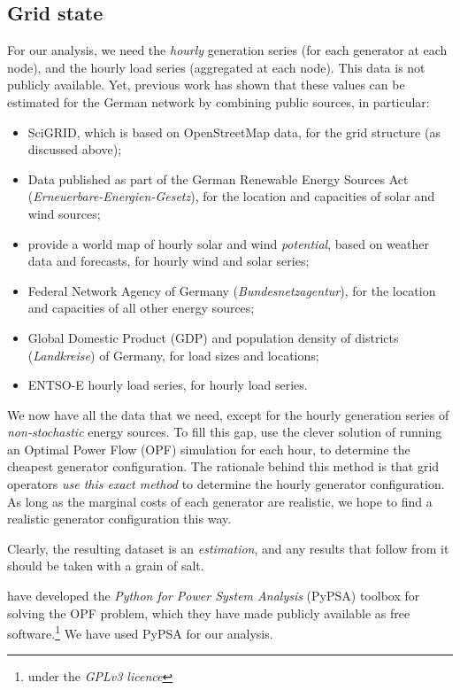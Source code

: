 \documentclass[main.tex]{subfiles}
\begin{document}
\subsection{Grid state}
For our analysis, we need the \emph{hourly} generation series (for each generator at each node), and the hourly load series (aggregated at each node). This data is not publicly available. Yet, previous work \citep{PyPSA} has shown that these values can be estimated for the German network by combining public sources, in particular:
\begin{itemize}
\item SciGRID, which is based on OpenStreetMap data, for the grid structure (as discussed above);
\item Data published as part of the German Renewable Energy Sources Act (\emph{Erneuerbare-Energien-Gesetz}), for the location and capacities of solar and wind sources;
\item \cite{Andresen2015} provide a world map of hourly solar and wind \emph{potential}, based on weather data and forecasts, for hourly wind and solar series;
\item Federal Network Agency of Germany (\emph{Bundesnetzagentur}), for the location and capacities of all other energy sources;
\item Global Domestic Product (GDP) and population density of districts (\emph{Landkreise}) of Germany, for load sizes and locations;
\item ENTSO-E hourly load series, for hourly load series.
\end{itemize}
We now have all the data that we need, except for the hourly generation series of \emph{non-stochastic} energy sources. To fill this gap, \cite{PyPSA} use the clever solution of running an Optimal Power Flow (OPF) simulation for each hour, to determine the cheapest generator configuration. The rationale behind this method is that grid operators \emph{use this exact method} to determine the hourly generator configuration. As long as the marginal costs of each generator are realistic, we hope to find a realistic generator configuration this way.

Clearly, the resulting dataset is an \emph{estimation}, and any results that follow from it should be taken with a grain of salt. 

\cite{PyPSA} have developed the \emph{Python for Power System Analysis} (PyPSA) toolbox for solving the OPF problem, which they have made publicly available as free software.\footnote{under the \emph{GPLv3 licence}} We have used PyPSA for our analysis.
\end{document}
